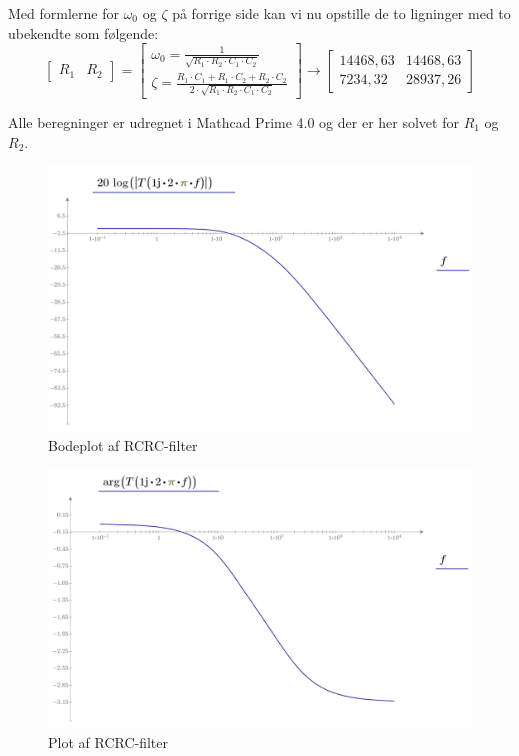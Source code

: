 Med formlerne for $\omega_{0}$ og $\zeta$ på forrige side kan vi nu opstille de to ligninger med to ubekendte som følgende: 
\[ \begin{bmatrix}
R_{1} & R_{2}
\end{bmatrix} = \begin{bmatrix}
\omega_{0}=\frac{1}{\sqrt{R_{1} \cdot R_{2} \cdot C_{1} \cdot C_{2}}} \\ 
\zeta= \frac{R_{1} \cdot C_{1} + R_{1} \cdot C_{2}+R_{2} \cdot C_{2}}{2 \cdot \sqrt{R_{1} \cdot R_{2} \cdot C_{1} \cdot C_{2}}}
\end{bmatrix} \rightarrow \begin{bmatrix}
14468,63 & 14468,63 \\ 7234,32
& 28937,26 
\end{bmatrix}\]

Alle beregninger er udregnet i Mathcad Prime 4.0 og der er her solvet for $R_{1}$ og $R_{2}$.

\begin{figure}[h!]
	\centering
	\includegraphics[width=0.7\linewidth]{Hardwaredesign/RCRCfilter1}
	\caption{Bodeplot af RCRC-filter}
	\label{fig:RCRCfilter1}
\end{figure}

\begin{figure}[h!]
	\centering
	\includegraphics[width=0.7\linewidth]{Hardwaredesign/RCRCfilter2}
	\caption{Plot af RCRC-filter}
	\label{fig:RCRCfilter2}
\end{figure}

